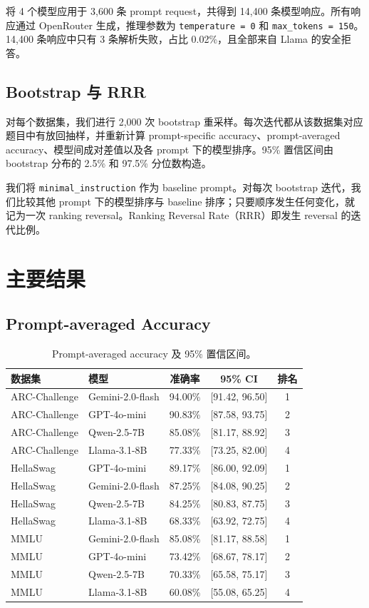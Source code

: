 \documentclass[11pt,a4paper]{ctexart}
\begin{document}
将 4 个模型应用于 3,600 条 prompt request，共得到 14,400 条模型响应。所有响应通过 OpenRouter 生成，推理参数为 \texttt{temperature = 0} 和 \texttt{max\_tokens = 150}。14,400 条响应中只有 3 条解析失败，占比 0.02\%，且全部来自 Llama 的安全拒答。

\subsection{Bootstrap 与 RRR}

对每个数据集，我们进行 2,000 次 bootstrap 重采样。每次迭代都从该数据集对应题目中有放回抽样，并重新计算 prompt-specific accuracy、prompt-averaged accuracy、模型间成对差值以及各 prompt 下的模型排序。95\% 置信区间由 bootstrap 分布的 2.5\% 和 97.5\% 分位数构造。

我们将 \texttt{minimal\_instruction} 作为 baseline prompt。对每次 bootstrap 迭代，我们比较其他 prompt 下的模型排序与 baseline 排序；只要顺序发生任何变化，就记为一次 ranking reversal。Ranking Reversal Rate（RRR）即发生 reversal 的迭代比例。

\section{主要结果}

\subsection{Prompt-averaged Accuracy}

\begin{table}[H]
\centering
\caption{Prompt-averaged accuracy 及 95\% 置信区间。}
\begin{tabular}{llccc}
\toprule
数据集 & 模型 & 准确率 & 95\% CI & 排名 \\
\midrule
ARC-Challenge & Gemini-2.0-flash & 94.00\% & [91.42, 96.50] & 1 \\
ARC-Challenge & GPT-4o-mini & 90.83\% & [87.58, 93.75] & 2 \\
ARC-Challenge & Qwen-2.5-7B & 85.08\% & [81.17, 88.92] & 3 \\
ARC-Challenge & Llama-3.1-8B & 77.33\% & [73.25, 82.00] & 4 \\
HellaSwag & GPT-4o-mini & 89.17\% & [86.00, 92.09] & 1 \\
HellaSwag & Gemini-2.0-flash & 87.25\% & [84.08, 90.25] & 2 \\
HellaSwag & Qwen-2.5-7B & 84.25\% & [80.83, 87.75] & 3 \\
HellaSwag & Llama-3.1-8B & 68.33\% & [63.92, 72.75] & 4 \\
MMLU & Gemini-2.0-flash & 85.08\% & [81.17, 88.58] & 1 \\
MMLU & GPT-4o-mini & 73.42\% & [68.67, 78.17] & 2 \\
MMLU & Qwen-2.5-7B & 70.33\% & [65.58, 75.17] & 3 \\
MMLU & Llama-3.1-8B & 60.08\% & [55.08, 65.25] & 4 \\
\bottomrule
\end{tabular}
\end{table}
\end{document}
